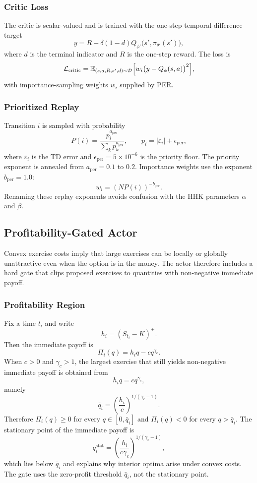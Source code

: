 \documentclass[a4paper,fleqn]{cas-dc}
\begin{document}
\subsubsection{Critic Loss}

The critic is scalar-valued and is trained with the one-step temporal-difference target
\[
y = R + \delta (1-d) Q_{\phi'}\bigl(s',\pi_{\theta'}(s')\bigr),
\]
where $d$ is the terminal indicator and $R$ is the one-step reward. The loss is
\begin{equation*}
\mathcal{L}_{\mathrm{critic}}
=
\mathbb{E}_{(s,a,R,s',d) \sim \mathcal{D}}
\Bigl[
w_i \bigl(y - Q_\phi(s,a)\bigr)^2
\Bigr],
\end{equation*}
with importance-sampling weights $w_i$ supplied by PER.

\subsubsection{Prioritized Replay}

Transition $i$ is sampled with probability
\[
P(i) = \frac{p_i^{a_{\mathrm{per}}}}{\sum_k p_k^{a_{\mathrm{per}}}},
\qquad
p_i = |\varepsilon_i| + \epsilon_{\mathrm{per}},
\]
where $\varepsilon_i$ is the TD error and $\epsilon_{\mathrm{per}} = 5 \times 10^{-6}$ is the priority floor. The priority exponent is annealed from $a_{\mathrm{per}} = 0.1$ to $0.2$. Importance weights use the exponent $b_{\mathrm{per}} = 1.0$:
\[
w_i = (N P(i))^{-b_{\mathrm{per}}}.
\]
Renaming these replay exponents avoids confusion with the HHK parameters $\alpha$ and $\beta$.

\subsection{Profitability-Gated Actor}
\label{sec:profitability_gate}

Convex exercise costs imply that large exercises can be locally or globally unattractive even when the option is in the money. The actor therefore includes a hard gate that clips proposed exercises to quantities with non-negative immediate payoff.

\subsubsection{Profitability Region}

Fix a time $t_i$ and write
\[
h_i = (S_{t_i} - K)^+.
\]
Then the immediate payoff is
\[
\Pi_i(q) = h_i q - c q^{\gamma_c}.
\]
When $c > 0$ and $\gamma_c > 1$, the largest exercise that still yields non-negative immediate payoff is obtained from
\[
h_i q = c q^{\gamma_c},
\]
namely
\begin{equation}
\label{eq:qbar}
\bar{q}_i =
\left(
\frac{h_i}{c}
\right)^{1/(\gamma_c - 1)}.
\end{equation}
Therefore $\Pi_i(q) \ge 0$ for every $q \in [0,\bar{q}_i]$ and $\Pi_i(q) < 0$ for every $q > \bar{q}_i$. The stationary point of the immediate payoff is
\[
q_i^{\mathrm{stat}} =
\left(
\frac{h_i}{c \gamma_c}
\right)^{1/(\gamma_c - 1)},
\]
which lies below $\bar{q}_i$ and explains why interior optima arise under convex costs. The gate uses the zero-profit threshold $\bar{q}_i$, not the stationary point.
\end{document}
